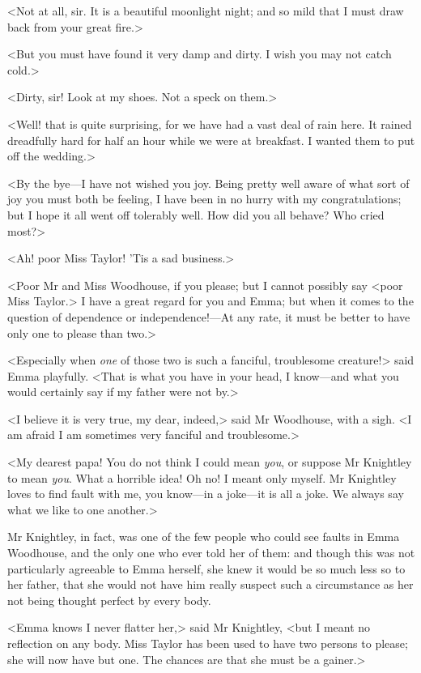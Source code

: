 <Not at all, sir. It is a beautiful moonlight night; and so mild that I must draw back from your great fire.>

<But you must have found it very damp and dirty. I wish you may not catch cold.>

<Dirty, sir! Look at my shoes. Not a speck on them.>

<Well! that is quite surprising, for we have had a vast deal of rain here. It rained dreadfully hard for half an hour while we were at breakfast. I wanted them to put off the wedding.>

<By the bye—I have not wished you joy. Being pretty well aware of what sort of joy you must both be feeling, I have been in no hurry with my congratulations; but I hope it all went off tolerably well. How did you all behave? Who cried most?>

<Ah! poor Miss Taylor! 'Tis a sad business.>

<Poor Mr and Miss Woodhouse, if you please; but I cannot possibly say <poor Miss Taylor.> I have a great regard for you and Emma; but when it comes to the question of dependence or independence!—At any rate, it must be better to have only one to please than two.>

<Especially when \textit{one} of those two is such a fanciful, troublesome creature!> said Emma playfully. <That is what you have in your head, I know—and what you would certainly say if my father were not by.>

<I believe it is very true, my dear, indeed,> said Mr Woodhouse, with a sigh. <I am afraid I am sometimes very fanciful and troublesome.>

<My dearest papa! You do not think I could mean \textit{you}, or suppose Mr Knightley to mean \textit{you}. What a horrible idea! Oh no! I meant only myself. Mr Knightley loves to find fault with me, you know—in a joke—it is all a joke. We always say what we like to one another.>

Mr Knightley, in fact, was one of the few people who could see faults in Emma Woodhouse, and the only one who ever told her of them: and though this was not particularly agreeable to Emma herself, she knew it would be so much less so to her father, that she would not have him really suspect such a circumstance as her not being thought perfect by every body.

<Emma knows I never flatter her,> said Mr Knightley, <but I meant no reflection on any body. Miss Taylor has been used to have two persons to please; she will now have but one. The chances are that she must be a gainer.>

